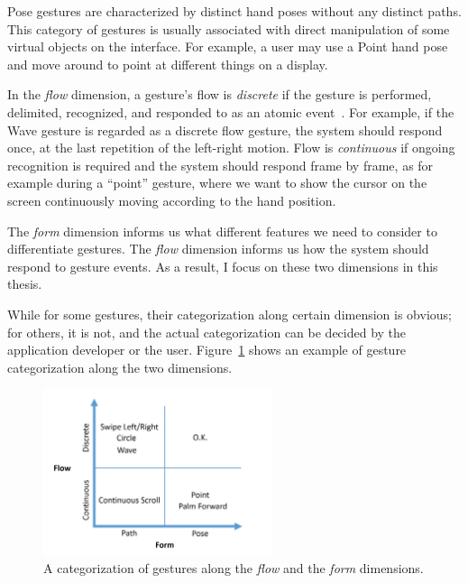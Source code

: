 Pose
gestures are characterized by distinct hand poses without any distinct paths.
This category of gestures is usually associated with direct manipulation of some virtual
objects on the interface.
For example, a user may use a Point hand pose and move around to
point at different things on a display.

In the \textit{flow} dimension, a gesture's flow is
\textit{discrete} if the gesture is performed, delimited, recognized, and
responded to as an atomic event~\cite{wobbrock09}. For example, if the Wave gesture is
regarded as a discrete flow gesture, the system should respond once, at the last
repetition of the left-right motion. Flow is \textit{continuous} if ongoing
recognition is required and the system should respond frame by frame, as for example during a ``point'' gesture, where we want to show the cursor on the screen
continuously moving according to the hand position. 

The \textit{form} dimension informs us what different features we need to
consider to differentiate gestures.
The \textit{flow} dimension informs us how the system should respond to gesture
events. As a result, I focus on these two dimensions in this thesis. 

While for
some gestures, their categorization along certain dimension is obvious; for
others, it is not, and the actual categorization can be decided by the
application developer or the user. Figure~\ref{fig:flow-form} shows an example
of gesture categorization along the two dimensions.

\begin{figure}[tbh]
\centering
\includegraphics[width=0.6\textwidth]{figures/taxonomy_all.jpg}
\caption{A categorization of gestures along the \textit{flow} and the
\textit{form} dimensions.}
\label{fig:flow-form}
\end{figure}

